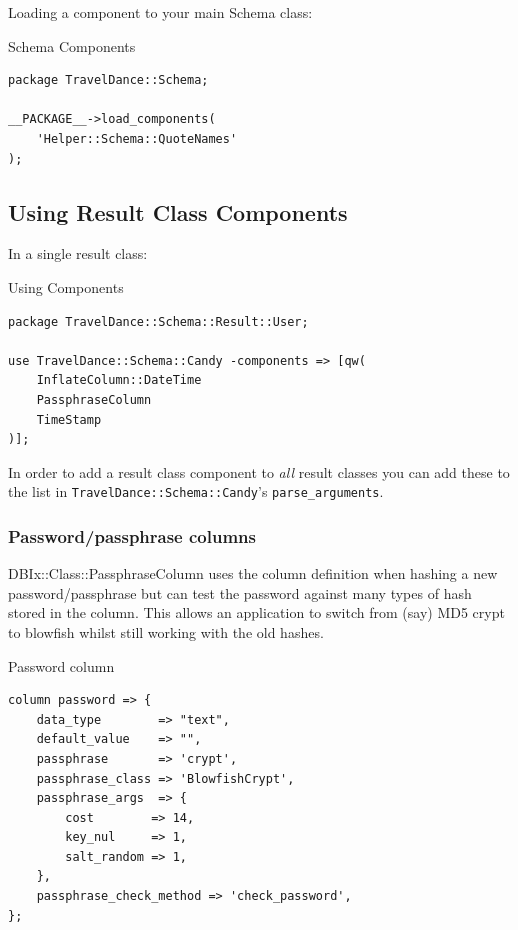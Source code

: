 Loading a component to your main Schema class:

\begin{frame}[fragile]{Schema Components}
\begin{lstlisting}
package TravelDance::Schema;
 
__PACKAGE__->load_components(
    'Helper::Schema::QuoteNames'
);
\end{lstlisting}
\end{frame}

\subsection{Using Result Class Components}

In a single result class:

\begin{frame}[fragile]{Using Components}
\begin{lstlisting}
package TravelDance::Schema::Result::User;

use TravelDance::Schema::Candy -components => [qw(
    InflateColumn::DateTime 
    PassphraseColumn
    TimeStamp
)];
\end{lstlisting}
\end{frame}

In order to add a result class component to \emph{all} result classes you
can add these to the list 
in \verb|TravelDance::Schema::Candy|'s \verb|parse_arguments|.

\subsubsection{Password/passphrase columns}

DBIx::Class::PassphraseColumn uses the column definition when hashing a new
password/passphrase but can test the password against many types of hash
stored in the column. This allows an application to switch from (say)
MD5 crypt to blowfish whilst still working with the old hashes.

\begin{frame}[fragile]{Password column}
\begin{lstlisting}
column password => {
    data_type        => "text",
    default_value    => "",
    passphrase       => 'crypt',
    passphrase_class => 'BlowfishCrypt',
    passphrase_args  => {
        cost        => 14,
        key_nul     => 1,
        salt_random => 1,
    },
    passphrase_check_method => 'check_password',
};
\end{lstlisting}
\end{frame}

